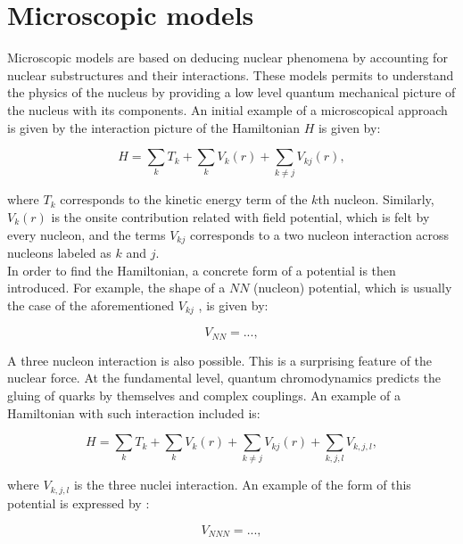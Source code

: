 \documentclass[openany]{book}
\begin{document}
\section{Microscopic models} \label{sec:microscopicalModels}

Microscopic models are based on deducing nuclear phenomena by accounting for nuclear substructures and their interactions. These models permits to understand  the physics of the nucleus by providing a low level quantum mechanical picture of the nucleus with its components. An initial example of a microscopical approach is given by the interaction picture of the Hamiltonian $H$ is given by: 

\begin{equation} \label{eq:micro_hamiltonian}
	H = \sum_{k} T_k + \sum_{k} V_k (r) + \sum_{k \neq j} V_{kj}(r),
\end{equation}

where $T_k$ corresponds to the kinetic energy term of the $k$th nucleon. Similarly, $V_k(r)$ is the onsite contribution related with field potential, which is felt by every nucleon, and the terms $V_{kj}$ corresponds to a two nucleon interaction across nucleons labeled as $k$ and $j$. \\

In order to find the Hamiltonian, a concrete form of a potential is then introduced. For example, the shape of a $NN$ (nucleon) potential, which is usually the case of the aforementioned $V_{kj}$ ,  is given by:

\begin{equation} \label{eq:micro_NN}
	V_{NN} = ..., 
\end{equation}

A three nucleon interaction is also possible. This is a surprising feature of the nuclear force. At the fundamental level, quantum chromodynamics predicts the gluing of quarks by themselves and complex couplings. An example of a Hamiltonian with such interaction included is:

\begin{equation} \label{eq:micro_hamiltonian_NNN}
	H = \sum_{k} T_k + \sum_{k} V_k (r) + \sum_{k \neq j} V_{kj}(r) +   \sum_{k, j ,l } {V_{k, j, l}} , 
\end{equation}

where $V_{k, j, l}$ is the three nuclei interaction. An example of the form of this potential is expressed by : 

\begin{equation} \label{eq:micro_NNN}
	V_{NNN} = ..., 
\end{equation}
\end{document}
